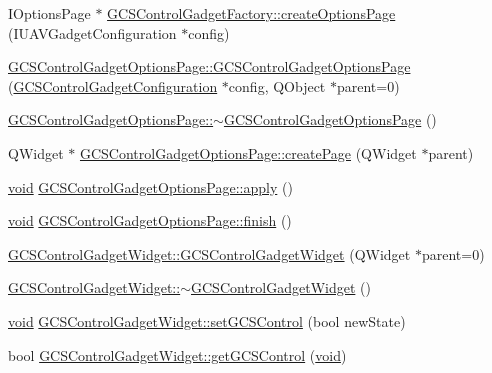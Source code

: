 \begin{DoxyCompactItemize}
\item 
\-I\-Options\-Page $\ast$ \hyperlink{group___g_c_s_control_gadget_plugin_gaee4fe12f6708684eb50d0bd348633e8a}{\-G\-C\-S\-Control\-Gadget\-Factory\-::create\-Options\-Page} (\-I\-U\-A\-V\-Gadget\-Configuration $\ast$config)
\item 
\hyperlink{group___g_c_s_control_gadget_plugin_ga133610c0fce1048e9c145e0e6f4ff7b8}{\-G\-C\-S\-Control\-Gadget\-Options\-Page\-::\-G\-C\-S\-Control\-Gadget\-Options\-Page} (\hyperlink{class_g_c_s_control_gadget_configuration}{\-G\-C\-S\-Control\-Gadget\-Configuration} $\ast$config, \-Q\-Object $\ast$parent=0)
\item 
\hyperlink{group___g_c_s_control_gadget_plugin_ga1dbf3c631b0254ac184bfa202ea00b17}{\-G\-C\-S\-Control\-Gadget\-Options\-Page\-::$\sim$\-G\-C\-S\-Control\-Gadget\-Options\-Page} ()
\item 
\-Q\-Widget $\ast$ \hyperlink{group___g_c_s_control_gadget_plugin_ga581ba836a94117d6d887ee555a4917c6}{\-G\-C\-S\-Control\-Gadget\-Options\-Page\-::create\-Page} (\-Q\-Widget $\ast$parent)
\item 
\hyperlink{group___u_a_v_objects_plugin_ga444cf2ff3f0ecbe028adce838d373f5c}{void} \hyperlink{group___g_c_s_control_gadget_plugin_gad8fa5da9631986d02639e5b520028c91}{\-G\-C\-S\-Control\-Gadget\-Options\-Page\-::apply} ()
\item 
\hyperlink{group___u_a_v_objects_plugin_ga444cf2ff3f0ecbe028adce838d373f5c}{void} \hyperlink{group___g_c_s_control_gadget_plugin_ga99dea02a466b40903d82ed298e62a038}{\-G\-C\-S\-Control\-Gadget\-Options\-Page\-::finish} ()
\item 
\hyperlink{group___g_c_s_control_gadget_plugin_ga631488a05f2911312aa2701deafc099e}{\-G\-C\-S\-Control\-Gadget\-Widget\-::\-G\-C\-S\-Control\-Gadget\-Widget} (\-Q\-Widget $\ast$parent=0)
\item 
\hyperlink{group___g_c_s_control_gadget_plugin_gac531923c2dca3888a8ff072acf4949f6}{\-G\-C\-S\-Control\-Gadget\-Widget\-::$\sim$\-G\-C\-S\-Control\-Gadget\-Widget} ()
\item 
\hyperlink{group___u_a_v_objects_plugin_ga444cf2ff3f0ecbe028adce838d373f5c}{void} \hyperlink{group___g_c_s_control_gadget_plugin_gaa7bf374aeebdf1e677885605644c508c}{\-G\-C\-S\-Control\-Gadget\-Widget\-::set\-G\-C\-S\-Control} (bool new\-State)
\item 
bool \hyperlink{group___g_c_s_control_gadget_plugin_ga4802bb05a27e5b7b98fba727aa298cbf}{\-G\-C\-S\-Control\-Gadget\-Widget\-::get\-G\-C\-S\-Control} (\hyperlink{group___u_a_v_objects_plugin_ga444cf2ff3f0ecbe028adce838d373f5c}{void})

\end{DoxyCompactItemize}
